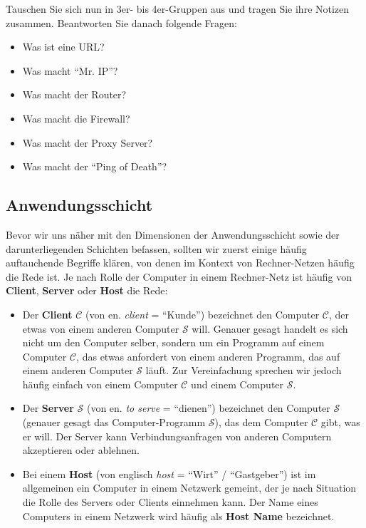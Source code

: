 \begin{myexercise}
Tauschen Sie sich nun in 3er- bis 4er-Gruppen aus und tragen Sie ihre Notizen zusammen. Beantworten Sie danach folgende Fragen:
\begin{itemize}
\item Was ist eine URL?
\item Was macht ``Mr. IP''?
\item Was macht der Router?
\item Was macht die Firewall?
\item Was macht der Proxy Server? 
\item Was macht der ``Ping of Death''? \faSkull
\end{itemize}
\end{myexercise}

\subsection{Anwendungsschicht}

Bevor wir uns näher mit den Dimensionen der Anwendungsschicht sowie der darunterliegenden Schichten befassen, sollten wir zuerst einige häufig auftauchende Begriffe klären, von denen im Kontext von Rechner-Netzen häufig die Rede ist. Je nach Rolle der Computer in einem Rechner-Netz ist häufig von \textbf{Client}, \textbf{Server} oder \textbf{Host} die Rede:
\begin{itemize}
\item Der \textbf{Client} $\mathcal{C}$ (von en. \textit{client} = ``Kunde'') bezeichnet den Computer $\mathcal{C}$, der etwas von einem anderen Computer $\mathcal{S}$ will. Genauer gesagt handelt es sich nicht um den Computer selber, sondern um ein Programm auf einem Computer $\mathcal{C}$, das etwas anfordert von einem anderen Programm, das auf einem anderen Computer $\mathcal{S}$ läuft. Zur Vereinfachung sprechen wir jedoch häufig einfach von einem Computer $\mathcal{C}$ und einem Computer $\mathcal{S}$.
\item Der \textbf{Server} $\mathcal{S}$ (von en. \textit{to serve} = ``dienen'') bezeichnet  den Computer $\mathcal{S}$ (genauer gesagt das Computer-Programm $\mathcal{S}$), das dem Computer $\mathcal{C}$ gibt, was er will. Der Server kann Verbindungsanfragen von anderen Computern akzeptieren oder ablehnen.
\item Bei einem \textbf{Host} (von englisch \textit{host} = ``Wirt'' / ``Gastgeber'') ist im allgemeinen ein Computer in einem Netzwerk gemeint, der je nach Situation die Rolle des Servers oder Clients einnehmen kann. Der Name eines Computers in einem Netzwerk wird häufig als \textbf{Host Name} bezeichnet.
\end{itemize}


